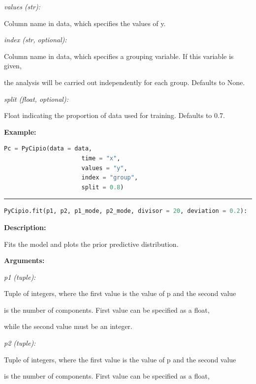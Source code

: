 \documentclass{article}
\begin{document}
\indent \indent \textit{values (str):} 

\indent \indent \indent Column name in data, which specifies the values of y.
            
\indent \indent \textit{index (str, optional):} 

\indent \indent \indent Column name in data, which specifies a grouping variable. If this variable is given, 

\indent \indent \indent the analysis will be carried out independently for each group. Defaults to None.

\indent \indent \textit{split (float, optional):} 

\indent \indent \indent Float indicating the proportion of data used for training. Defaults to 0.7.


\indent \textbf{Example:}
\begin{lstlisting}[language=Python]
		 Pc = PyCipio(data = data, 
                      time = "x", 
                      values = "y", 
                      index = "group", 
                      split = 0.8)

\end{lstlisting}

\hrule

\begin{lstlisting}[language=Python]
    PyCipio.fit(p1, p2, p1_mode, p2_mode, divisor = 20, deviation = 0.2):
\end{lstlisting}

\indent \textbf{Description:} 

\indent \indent Fits the model and plots the prior predictive distribution.

\indent \textbf{Arguments:}

\indent \indent \textit{p1 (tuple):} 

\indent \indent \indent Tuple of integers, where the first value is the value of p and the second value

\indent \indent \indent is the number of components. First value can be specified as a float, 

\indent \indent \indent while the second value must be an integer.

\indent \indent \textit{p2 (tuple):} 

\indent \indent \indent Tuple of integers, where the first value is the value of p and the second value

\indent \indent \indent is the number of components. First value can be specified as a float, 
\end{document}
